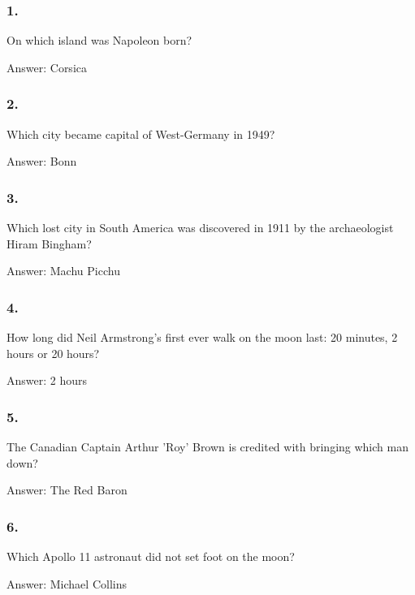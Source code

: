 \documentclass{beamer}
\begin{document}
    \begin{frame}
        \frametitle{1.}
        On which island was Napoleon born?\\

        \begin{center}
            Answer: Corsica
        \end{center}
    \end{frame}

    \begin{frame}
        \frametitle{2.}
        Which city became capital of West-Germany in 1949?\\

        \begin{center}
            Answer: Bonn
        \end{center}
    \end{frame}

    \begin{frame}
        \frametitle{3.}
        Which lost city in South America was discovered in 1911 by the
        archaeologist Hiram Bingham?\\

        \begin{center}
            Answer: Machu Picchu
        \end{center}
    \end{frame}

    \begin{frame}
        \frametitle{4.}
        How long did Neil Armstrong’s first ever walk on the moon last: 20
        minutes, 2 hours or 20 hours?\\

        \begin{center}
            Answer: 2 hours
        \end{center}
    \end{frame}

    \begin{frame}
        \frametitle{5.}
        The Canadian Captain Arthur 'Roy' Brown is credited with bringing
        which man down?\\

        \begin{center}
            Answer: The Red Baron
        \end{center}
    \end{frame}

    \begin{frame}
        \frametitle{6.}
        Which Apollo 11 astronaut did not set foot on the moon?\\

        \begin{center}
            Answer: Michael Collins
        \end{center}
    \end{frame}
\end{document}
